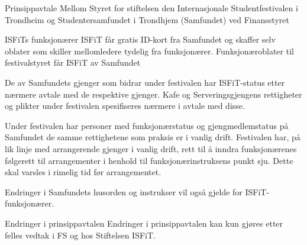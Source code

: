 \begin{instruks*}{Prinsippavtale Mellom Styret for stiftelsen den Internasjonale Studentfestivalen i
        Trondheim og Studentersamfundet i Trondhjem (Samfundet) ved Finansstyret}
\begin{instruksledd}{ISFiTs funksjonærer}
        ISFiT får gratis ID-kort fra Samfundet og skaffer selv oblater som skiller mellomledere tydelig fra
        funksjonærer.
        Funksjonæroblater til festivalstyret får ISFiT av Samfundet

        De av Samfundets gjenger som bidrar under festivalen har ISFiT-status etter nærmere avtale med de
        respektive
        gjenger. Kafe og Serveringsgjengens rettigheter og plikter under festivalen spesifiseres nærmere
        i avtale med
        disse.

        Under festivalen har personer med funksjonærstatus og gjengmedlemstatus på Samfundet de samme
        rettighetene som
        praksis er i vanlig drift. Festivalen har, på lik linje med arrangerende gjenger i vanlig drift,
        rett til å inndra
        funksjonærenes følgerett til arrangementer i henhold til funksjonærinstruksens punkt sju. Dette skal
        varsles i rimelig
        tid før arrangementet.

        Endringer i Samfundets husorden og instrukser vil også gjelde for ISFiT-funksjonærer.
    \end{instruksledd}


    \begin{instruksledd}{Endringer i prinsippavtalen}
        Endringer i prinsippavtalen kan kun gjøres etter felles vedtak i FS og hos Stiftelsen ISFiT.
    \end{instruksledd} 


\end{instruks*}


